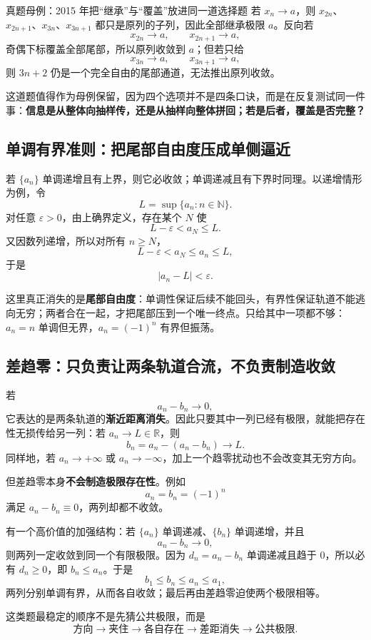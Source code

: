 \documentclass[11pt,a4paper]{ctexart}
\newcommand{\kw}[1]{\textbf{\color{deep}#1}}
\begin{document}
\begin{corebox}{真题母例：2015 年把“继承”与“覆盖”放进同一道选择题}
若 $x_n\to a$，则 $x_{2n}$、$x_{2n+1}$、$x_{3n}$、$x_{3n+1}$ 都只是原列的子列，因此全部继承极限 $a$。反向若
\[
x_{2n}\to a,\qquad x_{2n+1}\to a,
\]
奇偶下标覆盖全部尾部，所以原列收敛到 $a$；但若只给
\[
x_{3n}\to a,\qquad x_{3n+1}\to a,
\]
则 $3n+2$ 仍是一个完全自由的尾部通道，无法推出原列收敛。

这道题值得作为母例保留，因为四个选项并不是四条口诀，而是在反复测试同一件事：\textbf{信息是从整体向抽样传，还是从抽样向整体拼回；若是后者，覆盖是否完整？}
\end{corebox}

\subsection{单调有界准则：把尾部自由度压成单侧逼近}

若 $\{a_n\}$ 单调递增且有上界，则它必收敛；单调递减且有下界时同理。以递增情形为例，令
\[
L=\sup\{a_n:n\in\mathbb N\}.
\]
对任意 $\varepsilon>0$，由上确界定义，存在某个 $N$ 使
\[
L-\varepsilon<a_N\le L.
\]
又因数列递增，所以对所有 $n\ge N$，
\[
L-\varepsilon<a_N\le a_n\le L,
\]
于是
\[
\lvert a_n-L\rvert<\varepsilon.
\]

这里真正消失的是\kw{尾部自由度}：单调性保证后续不能回头，有界性保证轨道不能逃向无穷；两者合在一起，才把尾部压到一个唯一终点。只给其中一项都不够：$a_n=n$ 单调但无界，$a_n=(-1)^n$ 有界但振荡。

\subsection{差趋零：只负责让两条轨道合流，不负责制造收敛}

若
\[
a_n-b_n\to0,
\]
它表达的是两条轨道的\kw{渐近距离消失}。因此只要其中一列已经有极限，就能把存在性无损传给另一列：若 $a_n\to L\in\mathbb R$，则
\[
b_n=a_n-(a_n-b_n)\to L.
\]
同样地，若 $a_n\to+\infty$ 或 $a_n\to-\infty$，加上一个趋零扰动也不会改变其无穷方向。

但差趋零本身\textbf{不会制造极限存在性}。例如
\[
a_n=b_n=(-1)^n
\]
满足 $a_n-b_n\equiv0$，两列却都不收敛。

有一个高价值的加强结构：若 $\{a_n\}$ 单调递减、$\{b_n\}$ 单调递增，并且
\[
a_n-b_n\to0,
\]
则两列一定收敛到同一个有限极限。因为 $d_n=a_n-b_n$ 单调递减且趋于 $0$，所以必有 $d_n\ge0$，即 $b_n\le a_n$。于是
\[
b_1\le b_n\le a_n\le a_1,
\]
两列分别单调有界，从而各自收敛；最后再由差趋零迫使两个极限相等。

这类题最稳定的顺序不是先猜公共极限，而是
\[
\boxed{\text{方向}\to\text{夹住}\to\text{各自存在}\to\text{差距消失}\to\text{公共极限}.}
\]
\end{document}
